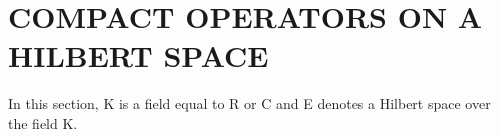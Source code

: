 \section{COMPACT OPERATORS ON A HILBERT SPACE}

In this section, K is a field equal to R or C and E denotes a Hilbert space over the field K.

